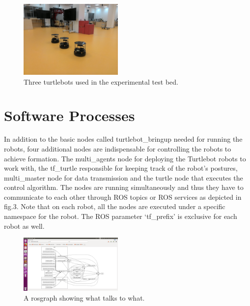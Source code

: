\documentclass[journal]{IEEEtran}
\begin{document}
\begin{figure}[!h]
\begin{center}
\includegraphics[width=2in]{robot3.jpg}
\caption{Three turtlebots used in the experimental test bed.}
\end{center}
\label{fig:mypicture2}
\end{figure}









\section{Software Processes}

In addition to the basic nodes called turtlebot{\_}bringup needed for running the robots, four additional nodes are indispensable for controlling the robots to achieve formation. 
The multi{\_}agents node for deploying the Turtlebot robots to work with, the tf{\_}turtle responsible for keeping track of the robot's postures, multi{\_}master node for data transmission and the turtle node that executes the control algorithm. The nodes are running simultaneously and thus they have to communicate to each other through ROS topics or ROS services as depicted in fig.3. Note that on each robot, all the nodes are executed under a specific namespace for the robot. The ROS parameter ‘tf{\_}prefix’ is exclusive for each robot as well.

\begin{figure}[!h]
\begin{center}
\includegraphics[width=2in]{4.png}
\caption{A rosgraph showing what talks to what.}
\end{center}
\label{fig2:mypicture2}
\end{figure}
\end{document}
